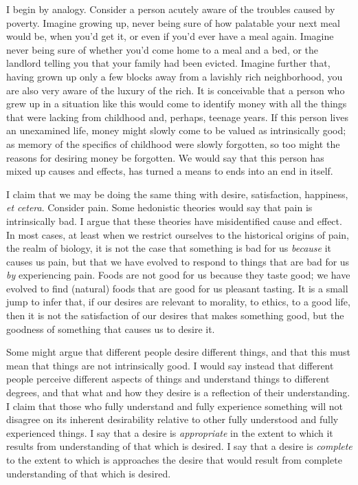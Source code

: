 \documentclass[letterpaper,11pt,twoside]{article}
\begin{document}
  I begin by analogy.  Consider a person acutely aware of the troubles caused by poverty.  Imagine growing up, never being sure of how palatable your next meal would be, when you'd get it, or even if you'd ever have a meal again.  Imagine never being sure of whether you'd come home to a meal and a bed, or the landlord telling you that your family had been evicted.  Imagine further that, having grown up only a few blocks away from a lavishly rich neighborhood, you are also very aware of the luxury of the rich.  It is conceivable that a person who grew up in a situation like this would come to identify money with all the things that were lacking from childhood and, perhaps, teenage years.  If this person lives an unexamined life, money might slowly come to be valued as intrinsically good; as memory of the specifics of childhood were slowly forgotten, so too might the reasons for desiring money be forgotten.  We would say that this person has mixed up causes and effects, has turned a means to ends into an end in itself.

  I claim that we may be doing the same thing with desire, satisfaction, happiness, \emph{et cetera}.  Consider pain.  Some hedonistic theories would say that pain is intrinsically bad.  I argue that these theories have misidentified cause and effect.  In most cases, at least when we restrict ourselves to the historical origins of pain, the realm of biology, it is not the case that something is bad for us \emph{because} it causes us pain, but that we have evolved to respond to things that are bad for us \emph{by} experiencing pain.  Foods are not good for us because they taste good; we have evolved to find (natural) foods that are good for us pleasant tasting.  It is a small jump to infer that, if our desires are relevant to morality, to ethics, to a good life, then it is not the satisfaction of our desires that makes something good, but the goodness of something that causes us to desire it.

  Some might argue that different people desire different things, and that this must mean that things are not intrinsically good.  I would say instead that different people perceive different aspects of things and understand things to different degrees, and that what and how they desire is a reflection of their understanding.  I claim that those who fully understand and fully experience something will not disagree on its inherent desirability relative to other fully understood and fully experienced things.  I say that a desire is \emph{appropriate} in the extent to which it results from understanding of that which is desired.  I say that a desire is \emph{complete} to the extent to which is approaches the desire that would result from complete understanding of that which is desired.
\end{document}
